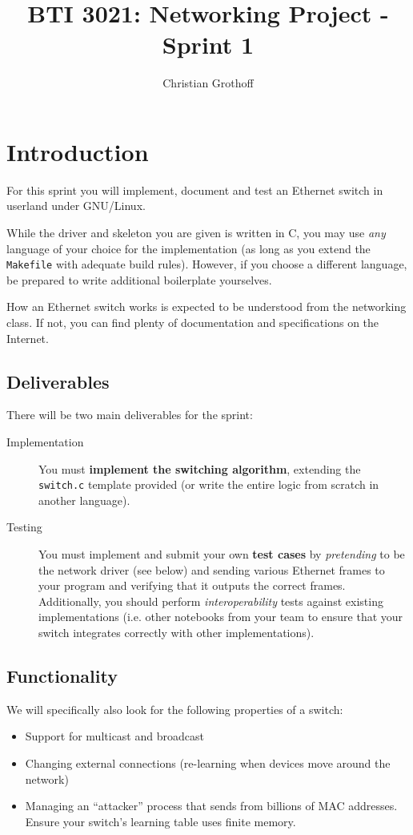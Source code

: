 \documentclass{article}
\title{BTI 3021: Networking Project - Sprint 1}
\author{Christian Grothoff}
\date{}
\begin{document}
\maketitle

\section{Introduction}

For this sprint you will implement, document and test an Ethernet
switch in userland under GNU/Linux.

While the driver and skeleton you are given is written in C, you may
use {\em any} language of your choice for the implementation (as long
as you extend the {\tt Makefile} with adequate build rules).  However,
if you choose a different language, be prepared to write additional
boilerplate yourselves.

How an Ethernet switch works is expected to be understood from the
networking class. If not, you can find plenty of documentation and
specifications on the Internet.


\subsection{Deliverables}

There will be two main deliverables for the sprint:

\begin{description}
\item[Implementation] You must {\bf implement the switching
  algorithm}, extending the {\tt switch.c} template provided
  (or write the entire logic from scratch in another language).
\item[Testing] You must implement and submit your own {\bf test cases}
  by {\em pretending} to be the network driver (see below) and sending
  various Ethernet frames to your program and verifying that it
  outputs the correct frames. Additionally, you should perform
  {\em interoperability} tests against existing
  implementations (i.e. other notebooks from your team to ensure that
  your switch integrates correctly with other implementations).
\end{description}


\subsection{Functionality}

We will specifically also look for the following properties of a switch:
\begin{itemize}
\item Support for multicast and broadcast
\item Changing external connections (re-learning when devices move around the network)
\item Managing an ``attacker'' process that sends from billions of MAC
  addresses.  Ensure your switch's learning table uses finite memory.
\end{itemize}
\end{document}
